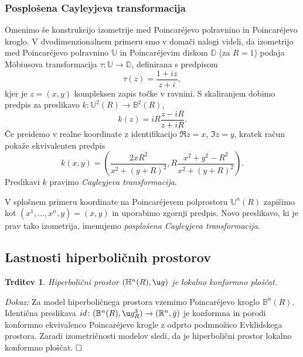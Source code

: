 \documentclass[a4paper]{article}
\newtheorem{trditev}{Trditev}
\def\qed{$\hfill\Box$}   %
\begin{document}
\subsubsection{Posplošena Cayleyjeva transformacija}
Omenimo še konstrukcijo izometrije med Poincar\'ejevo polravnino in Poincar\'ejevo kroglo. 
V dvodimenzionalnem primeru smo v domači nalogi videli, da izometrijo med Poincar\'ejevo polravnino $\mathbb{U}$ in Poincar\'ejevim diskom $\mathbb{D}$ (za $R=1$) podaja M\"obiusova transformacija $\tau \colon \mathbb{U} \to \mathbb{D}$, definirana s predpisom
\begin{equation}
\tau(z) = \frac{1+iz}{z+i},
\end{equation} 
kjer je $z=(x,y)$ kompleksen zapis točke v ravnini. S skaliranjem dobimo predpis za preslikavo $k \colon \mathbb{U}^{2}(R) \to \mathbb{B}^{2}(R)$,
\begin{equation}
k(z) = iR \frac{z-iR}{z+iR}.
\end{equation} 
Če preidemo v realne koordinate z identifikacijo $\Re{z}=x$, $\Im{z}=y$, kratek račun pokaže ekvivalenten predpis
\begin{equation}
k(x,y) = \left( \frac{2xR^2}{x^2+(y+R)^2}, R \frac{x^2+y^2-R^2}{x^2+(y+R)^2} \right).
\end{equation}
Preslikavi $k$ pravimo \emph{Cayleyjeva transformacija}.

V splošnem primeru koordinate na Poincar\'ejevem polprostoru $\mathbb{U}^{n}(R)$ zapišimo kot $(x^{1}, \dots , x^{n}, y) = (x,y)$ in uporabimo zgornji predpis. Novo preslikavo, ki je prav tako izometrija, imenujemo \emph{posplošena Cayleyjeva transformacija}.

\subsection{Lastnosti hiperboličnih prostorov}

\begin{trditev}
Hiperbolični prostor $(\mathbb{H}^{n}(R), \u g)$ je lokalno konformno ploščat.
\end{trditev}

\noindent
{\em Dokaz:\/} 
Za model hiperboličnega prostora vzemimo Poincar\'ejevo kroglo  $\mathbb{B}^{n}(R)$. Identična preslikava $id \colon (\mathbb{B}^{n}(R), \u g_{R}^{3}) \to (\mathbb{R}^{n}, \bar{g})$ je konformna in porodi konformno ekvivalenco Poincar\'ejeve krogle z odprto podmnožico Evklidskega prostora. Zaradi izometričnosti modelov sledi, da je hiperbolični prostor lokalno konformno ploščat.
\qed
\end{document}
